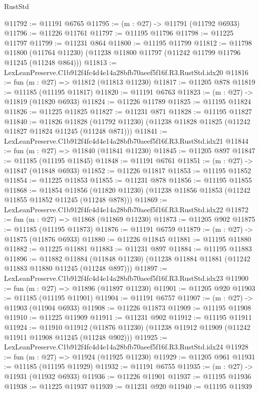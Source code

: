\begin{lexlean}{RustStd}
\begin{coremodule}
@11792 := @11191 @6765
@11795 := (m : @27) -> @11791 (@11792 @6933)
@11796 := @11226 @11761
@11797 := @11195 @11796
@11798 := @11225 @11797
@11799 := @11231 @864
@11800 := @11195 @11799
@11812 := @11798
    @11800
    (@11764 @11230)
    (@11238 @11800 @11797 (@11242 @11799 @11796 @11245 (@11248 @864)))
@11813 := LexLeanPreserve.C1b912f4fc4d4e14a28bfb70aeef5f16f.R3.RustStd.idx20
@11816 := fun (m : @27) => @11812 (@11813 @11230)
@11817 := @11205 @878
@11819 := @11185 (@11195 @11817)
@11820 := @11191 @6763
@11823 := (m : @27) -> @11819 (@11820 @6933)
@11824 := @11226 @11789
@11825 := @11195 @11824
@11826 := @11225 @11825
@11827 := @11231 @871
@11828 := @11195 @11827
@11840 := @11826
    @11828
    (@11792 @11230)
    (@11238 @11828 @11825 (@11242 @11827 @11824 @11245 (@11248 @871)))
@11841 := LexLeanPreserve.C1b912f4fc4d4e14a28bfb70aeef5f16f.R3.RustStd.idx21
@11844 := fun (m : @27) => @11840 (@11841 @11230)
@11845 := @11205 @897
@11847 := @11185 (@11195 @11845)
@11848 := @11191 @6761
@11851 := (m : @27) -> @11847 (@11848 @6933)
@11852 := @11226 @11817
@11853 := @11195 @11852
@11854 := @11225 @11853
@11855 := @11231 @878
@11856 := @11195 @11855
@11868 := @11854
    @11856
    (@11820 @11230)
    (@11238 @11856 @11853 (@11242 @11855 @11852 @11245 (@11248 @878)))
@11869 := LexLeanPreserve.C1b912f4fc4d4e14a28bfb70aeef5f16f.R3.RustStd.idx22
@11872 := fun (m : @27) => @11868 (@11869 @11230)
@11873 := @11205 @902
@11875 := @11185 (@11195 @11873)
@11876 := @11191 @6759
@11879 := (m : @27) -> @11875 (@11876 @6933)
@11880 := @11226 @11845
@11881 := @11195 @11880
@11882 := @11225 @11881
@11883 := @11231 @897
@11884 := @11195 @11883
@11896 := @11882
    @11884
    (@11848 @11230)
    (@11238 @11884 @11881 (@11242 @11883 @11880 @11245 (@11248 @897)))
@11897 := LexLeanPreserve.C1b912f4fc4d4e14a28bfb70aeef5f16f.R3.RustStd.idx23
@11900 := fun (m : @27) => @11896 (@11897 @11230)
@11901 := @11205 @920
@11903 := @11185 (@11195 @11901)
@11904 := @11191 @6757
@11907 := (m : @27) -> @11903 (@11904 @6933)
@11908 := @11226 @11873
@11909 := @11195 @11908
@11910 := @11225 @11909
@11911 := @11231 @902
@11912 := @11195 @11911
@11924 := @11910
    @11912
    (@11876 @11230)
    (@11238 @11912 @11909 (@11242 @11911 @11908 @11245 (@11248 @902)))
@11925 := LexLeanPreserve.C1b912f4fc4d4e14a28bfb70aeef5f16f.R3.RustStd.idx24
@11928 := fun (m : @27) => @11924 (@11925 @11230)
@11929 := @11205 @961
@11931 := @11185 (@11195 @11929)
@11932 := @11191 @6755
@11935 := (m : @27) -> @11931 (@11932 @6933)
@11936 := @11226 @11901
@11937 := @11195 @11936
@11938 := @11225 @11937
@11939 := @11231 @920
@11940 := @11195 @11939

\end{coremodule}
\end{lexlean}
